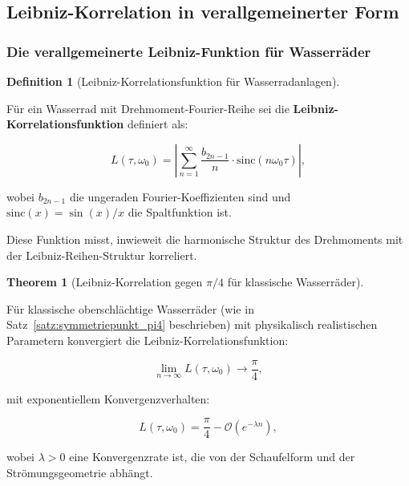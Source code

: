 \documentclass[a4paper,12pt]{article}
\theoremstyle{definition}
\newtheorem{definition}{Definition}
\newtheorem{theorem}{Theorem}
\begin{document}
\subsection{Leibniz-Korrelation in verallgemeinerter Form}

\subsubsection{Die verallgemeinerte Leibniz-Funktion für Wasserräder}

\begin{definition}[Leibniz-Korrelationsfunktion für Wasserradanlagen]
  \label{def:leibniz_korr_funktion}
  
  Für ein Wasserrad mit Drehmoment-Fourier-Reihe sei die \textbf{Leibniz-Korrelationsfunktion} definiert als:
  
  \begin{equation}
    L(\tau, \omega_0) = \left| \sum_{n=1}^{\infty} \frac{b_{2n-1}}{n} \cdot \text{sinc}(n \omega_0 \tau) \right|,
    \label{eq:leibniz_korr_def}
  \end{equation}
  
  wobei $b_{2n-1}$ die ungeraden Fourier-Koeffizienten sind und $\text{sinc}(x) = \sin(x)/x$ die Spaltfunktion ist.
  
  Diese Funktion misst, inwieweit die harmonische Struktur des Drehmoments mit der Leibniz-Reihen-Struktur korreliert.
\end{definition}

\begin{theorem}[Leibniz-Korrelation gegen $\pi/4$ für klassische Wasserräder]
  \label{theo:leibniz_konvergenz_pi4}
  
  Für klassische oberschlächtige Wasserräder (wie in Satz~\ref{satz:symmetriepunkt_pi4} beschrieben) mit physikalisch realistischen Parametern konvergiert die Leibniz-Korrelationsfunktion:
  
  \begin{equation}
    \lim_{n \to \infty} L(\tau, \omega_0) \to \frac{\pi}{4},
    \label{eq:leibniz_limit_pi4}
  \end{equation}
  
  mit exponentiellem Konvergenzverhalten:
  
  \begin{equation}
    L(\tau, \omega_0) = \frac{\pi}{4} - \mathcal{O}(e^{-\lambda n}),
    \label{eq:konvergenzrate}
  \end{equation}
  
  wobei $\lambda > 0$ eine Konvergenzrate ist, die von der Schaufelform und der Strömungsgeometrie abhängt.
\end{theorem}
\end{document}
